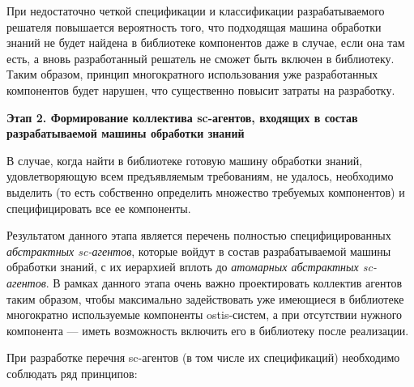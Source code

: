 При недостаточно четкой спецификации и классификации разрабатываемого решателя повышается вероятность того, что подходящая машина обработки знаний не будет найдена в библиотеке компонентов даже в случае, если она там есть, а вновь разработанный решатель не сможет быть включен в библиотеку. Таким образом, принцип многократного использования уже разработанных компонентов будет нарушен, что существенно повысит затраты на разработку.

\textbf{Этап 2. Формирование коллектива sc-агентов, входящих в состав разрабатываемой машины обработки знаний}

В случае, когда найти в библиотеке готовую машину обработки знаний, удовлетворяющую всем предъявляемым требованиям, не удалось, необходимо выделить (то есть собственно определить множество требуемых компонентов) и специфицировать все ее компоненты.

Результатом данного этапа является перечень полностью специфицированных \textit{абстрактных sc-агентов}, которые войдут в состав разрабатываемой машины обработки знаний, с их иерархией вплоть до \textit{атомарных абстрактных sc-агентов}. В рамках данного этапа очень важно проектировать коллектив агентов таким образом, чтобы максимально задействовать уже имеющиеся в библиотеке многократно используемые компоненты ostis-систем, а при отсутствии нужного компонента --- иметь возможность включить его в библиотеку после реализации.

При разработке перечня sc-агентов (в том числе их спецификаций) необходимо соблюдать ряд принципов:

